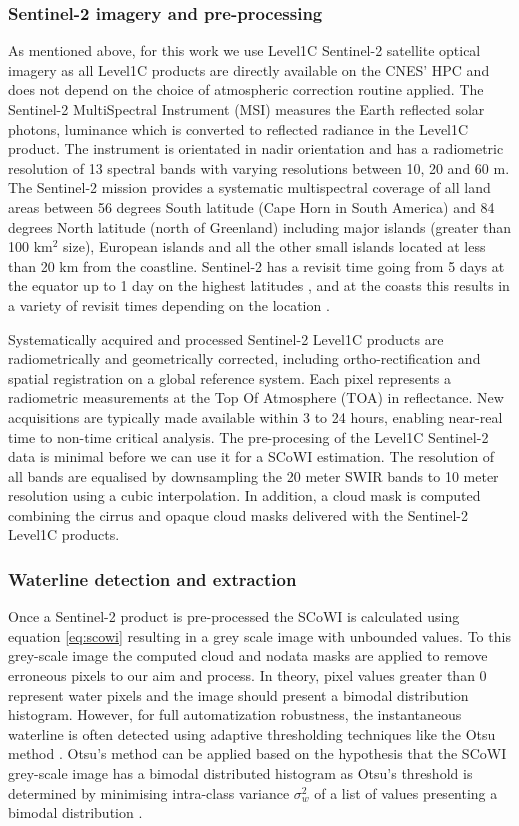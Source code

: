 \documentclass[remotesensing,article,submit,pdftex,moreauthors]{Definitions/mdpi}
\begin{document}
\subsubsection{Sentinel-2 imagery and pre-processing}
As mentioned above, for this work we use Level1C Sentinel-2 satellite optical imagery as all Level1C products are directly available on the CNES' HPC and does not depend on the choice of atmospheric correction routine applied. The Sentinel-2 MultiSpectral Instrument (MSI) measures the Earth reflected solar photons, luminance which is converted to reflected radiance in the Level1C product. The instrument is orientated in nadir orientation and has a radiometric resolution of 13 spectral bands with varying resolutions between 10, 20 and 60 m. The Sentinel-2 mission provides a systematic multispectral coverage of all land areas between 56 degrees South latitude (Cape Horn in South America) and 84 degrees North latitude (north of Greenland) including major islands (greater than 100 km$^2$ size), European islands and all the other small islands located at less than 20 km from the coastline. Sentinel-2 has a revisit time going from 5 days at the equator up to 1 day on the highest latitudes \citep{ESAreq}, and at the coasts this results in a variety of revisit times depending on the location \citep{BERGSMA2020}.

Systematically acquired and processed Sentinel-2 Level1C products are radiometrically and geometrically corrected, including ortho-rectification and spatial registration on a global reference system. Each pixel represents a radiometric measurements at the Top Of Atmosphere (TOA) in reflectance. New acquisitions are typically made available within 3 to 24 hours, enabling near-real time to non-time critical analysis. The pre-procesing of the Level1C Sentinel-2 data is minimal before we can use it for a SCoWI estimation. The resolution of all bands are equalised by downsampling the 20 meter SWIR bands to 10 meter resolution using a cubic interpolation. In addition, a cloud mask is computed combining the cirrus and opaque cloud masks delivered with the Sentinel-2 Level1C products.

\subsubsection{Waterline detection and extraction}
Once a Sentinel-2 product is pre-processed the SCoWI is calculated using equation \ref{eq:scowi} resulting in a grey scale image with unbounded values. To this grey-scale image the computed cloud and nodata masks are applied to remove erroneous pixels to our aim and process. In theory, pixel values greater than 0 represent water pixels and the image should present a bimodal distribution histogram. However, for full automatization robustness, the instantaneous waterline is often detected using adaptive thresholding techniques like the Otsu method \citep{Bishop_sub_pixel, VOS2019_sub}. Otsu's method can be applied based on the hypothesis that the SCoWI grey-scale image has a bimodal distributed histogram as Otsu's threshold is determined by minimising intra-class variance $\sigma_w^2$ of a list of values presenting a bimodal distribution \citep{OTSU1979}.
\end{document}
